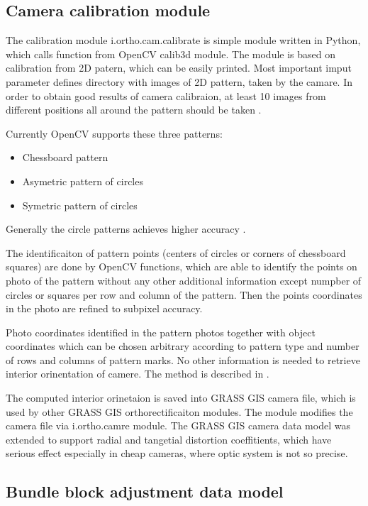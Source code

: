 \documentclass[a4paper,12pt]{report}
\begin{document}
\begin{itemize}
\subsection{Camera calibration module}

The calibration module i.ortho.cam.calibrate is simple module written in Python, which calls
function from OpenCV calib3d module. The module is based on calibration from 2D patern, which can 
be easily printed. Most important imput parameter defines directory with images of 2D pattern, 
taken by the camare. In order to obtain good results of camera calibraion, at least 10 images 
from different positions all around the pattern should be taken \cite{camera_calibration2013opencv}.

Currently OpenCV supports these three patterns:
\begin{itemize}
\item Chessboard pattern 
\item Asymetric pattern of circles
\item Symetric pattern of circles
\end{itemize}

Generally the circle patterns achieves higher accuracy \cite{camera_calibration2013opencv}.

The identificaiton of pattern points (centers of circles or corners of chessboard squares) 
are done by OpenCV functions, which are able to identify the points on photo of the pattern 
without any other additional information except numpber of circles or squares per row and column
of the pattern. Then the points coordinates in the photo are refined to subpixel accuracy.

Photo coordinates identified in the pattern photos together with object coordinates which can be chosen
arbitrary according to pattern type and number of rows and columns of pattern marks. 
No other information is needed to retrieve interior orinentation of camere. The method is described 
in \cite{zhang2000flexible}.

The computed interior orinetaion is saved into GRASS GIS camera file, which is used by other GRASS GIS 
orthorectificaiton modules. The module modifies the camera file via i.ortho.camre module.
The GRASS GIS camera data model was extended to support radial and tangetial distortion coeffitients, which 
have serious effect especially in cheap cameras, where optic system is not so precise.

\subsection{Bundle block adjustment data model}
 

\end{itemize}
\end{document}
